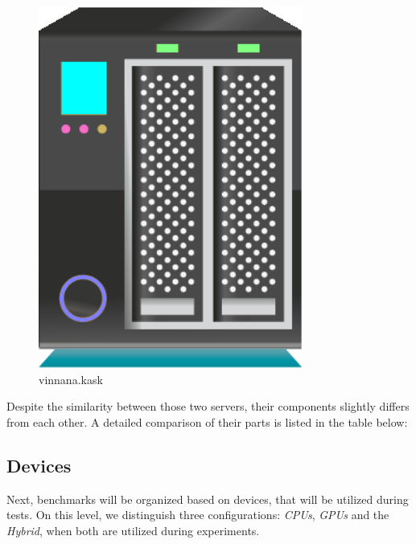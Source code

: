 \begin{figure}[hbt!]
\begin{minipage}[t]{0.21\textwidth}
        \includegraphics[width=\textwidth]{figures/servers/vinnana.kask.png}
        \caption{vinnana.kask}\label{fig:vinnana.kask}
    \end{minipage}
\end{figure}

Despite the similarity between those two servers, their components slightly
differs from each other. A detailed comparison of their parts is listed in the
table below:



\newpage

\subsection{Devices}
Next, benchmarks will be organized based on devices,
that will be utilized during tests. On this level, we distinguish three
configurations: \emph{CPUs}, \emph{GPUs} and the \emph{Hybrid}, when both
are utilized during experiments. 

